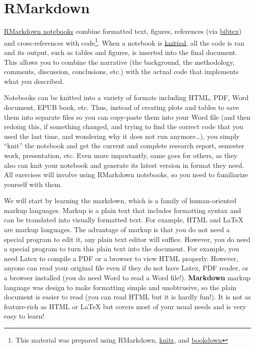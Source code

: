 \documentclass[
]{book}
\begin{document}
\hypertarget{rmarkdown}{%
\section{RMarkdown}\label{rmarkdown}}

\href{https://rmarkdown.rstudio.com/}{RMarkdown notebooks} combine formatted text, figures, references (via \href{http://www.bibtex.org/}{bibtex}) and cross-references with code\footnote{This material was prepared using RMarkdown, \href{(https://yihui.org/knitr/)}{knitr}, and \href{https://bookdown.org/}{bookdown}}. When a notebook is \href{https://yihui.org/knitr/}{knitted}, all the code is ran and its output, such as tables and figures, is inserted into the final document. This allows you to combine the narrative (the background, the methodology, comments, discussion, conclusions, etc.) with the actual code that implements what you described.

Notebooks can be knitted into a variety of formats including HTML, PDF, Word document, EPUB book, etc. Thus, instead of creating plots and tables to save them into separate files so you can copy-paste them into your Word file (and then redoing this, if something changed, and trying to find the correct code that you used the last time, and wondering why it does not run anymore\ldots), you simply ``knit'' the notebook and get the current and complete research report, semester work, presentation, etc. Even more importantly, same goes for others, as they also can knit your notebook and generate its latest version in format they need. All exercises will involve using RMarkdown notebooks, so you need to familiarize yourself with them.

We will start by learning the markdown, which is a family of human-oriented markup languages. Markup is a plain text that includes formatting syntax and can be translated into visually formatted text. For example, HTML and LaTeX are markup languages. The advantage of markup is that you do not need a special program to edit it, any plain text editor will suffice. However, you do need a special program to turn this plain text into the document. For example, you need Latex to compile a PDF or a browser to view HTML properly. However, anyone can read your original file even if they do not have Latex, PDF reader, or a browser installed (you do need Word to read a Word file!). \textbf{Markdown} markup language was design to make formatting simple and unobtrusive, so the plain document is easier to read (you can read HTML but it is hardly fun!). It is not as feature-rich as HTML or LaTeX but covers most of your usual needs and is very easy to learn!
\end{document}
